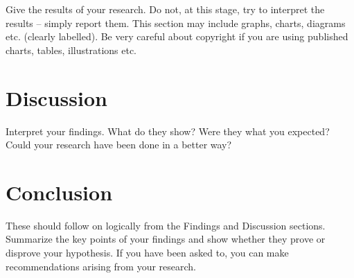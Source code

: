\documentclass[10pt, a4paper, twocolumn]{article} %
\begin{document}
Give the results of your research. Do not, at this stage, try to interpret the results – simply report them. 
This section may include graphs, charts, diagrams etc. (clearly labelled). Be very careful about copyright if you are using published charts, tables, illustrations etc.


\section{Discussion}

Interpret your findings. What do they show? Were they what you expected? 
Could your research have been done in a better way?

\section{Conclusion}

These should follow on logically from the Findings and Discussion sections. Summarize the key points of your findings and show whether they prove or disprove your hypothesis. 
If you have been asked to, you can make recommendations arising from your research.


\printbibliography[title={Bibliography}] %


\end{document}
